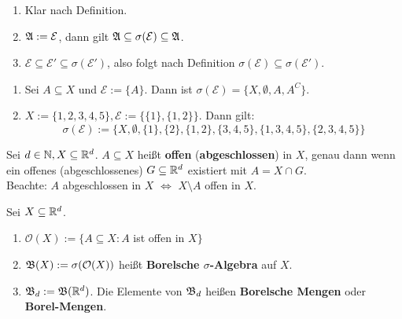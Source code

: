 \documentclass[a4paper,twoside,DIV15,BCOR12mm,chapterprefix=true,headings=onelinechapter]{scrbook}
\begin{document}
\begin{beweis}
\begin{enumerate}
\item Klar nach Definition.
\item $\mathfrak{A}:=\mathcal{E}$, dann gilt $\mathfrak{A}\subseteq\sigma(\mathcal{E})\subseteq\mathfrak{A}$.
\item $\mathcal{E}\subseteq\mathcal{E}'\subseteq\sigma(\mathcal{E}')$, also folgt nach Definition $\sigma(\mathcal{E})\subseteq\sigma(\mathcal{E}')$.
\end{enumerate}
\end{beweis}

\begin{beispiel}
\begin{enumerate}
\item Sei $A\subseteq X$ und $\mathcal{E}:=\{A\}$. Dann ist $\sigma(\mathcal{E})=\{X,\emptyset,A,A^C\}$.
\item $X:=\{1,2,3,4,5\}, \mathcal{E}:=\{\{1\},\{1,2\}\}$. Dann gilt:
\[\sigma(\mathcal{E}):=\{X,\emptyset, \{1\},\{2\},\{1,2\},\{3,4,5\},\{1,3,4,5\},\{2,3,4,5\}\}\]
\end{enumerate}
\end{beispiel}

\begin{erinnerung}
Sei $d\in\mathbb{N}, X\subseteq\mathbb{R}^d$. $A\subseteq X$ heißt \textbf{offen} (\textbf{abgeschlossen}) in $X$, genau dann wenn ein offenes (abgeschlossenes) $G\subseteq\mathbb{R}^d$ existiert mit $A=X\cap G$.\\
Beachte: $A$ abgeschlossen in $X$ $\iff$ $X\setminus A$ offen in $X$.
\end{erinnerung}

\begin{definition}
Sei $X\subseteq\mathbb{R}^d$.
\begin{enumerate}
\item $\mathcal{O}(X):=\{A\subseteq X:A$ ist offen in $X\}$
\item $\mathfrak{B}(X):=\sigma(\mathcal{O}(X))$ heißt \textbf{Borelsche $\sigma$-Algebra} auf $X$.
\item $\mathfrak{B}_d:=\mathfrak{B}(\mathbb{R}^d)$. Die Elemente von $\mathfrak{B}_d$ heißen \textbf{Borelsche Mengen} oder \textbf{Borel-Mengen}.
\end{enumerate}
\end{definition}
\end{document}
